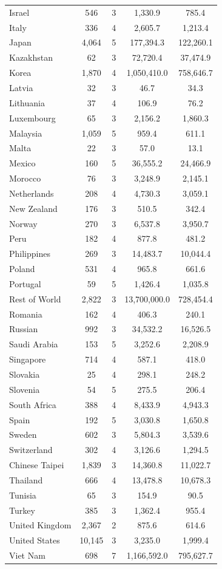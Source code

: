 \begin{center}
{\begin{tabular}{lcccc}
			Israel&546&3&1,330.9&785.4 \\
			Italy&336&4&2,605.7&1,213.4 \\
			Japan&4,064&5&177,394.3&122,260.1 \\
			Kazakhstan&62&3&72,720.4&37,474.9 \\
			Korea&1,870&4&1,050,410.0&758,646.7 \\
			Latvia&32&3&46.7&34.3 \\
			Lithuania&37&4&106.9&76.2 \\
			Luxembourg&65&3&2,156.2&1,860.3 \\
			Malaysia&1,059&5&959.4&611.1 \\
			Malta&22&3&57.0&13.1 \\
			Mexico&160&5&36,555.2&24,466.9 \\
			Morocco&76&3&3,248.9&2,145.1 \\
			Netherlands&208&4&4,730.3&3,059.1 \\
			New Zealand&176&3&510.5&342.4 \\
			Norway&270&3&6,537.8&3,950.7 \\
			Peru&182&4&877.8&481.2 \\
			Philippines&269&3&14,483.7&10,044.4 \\
			Poland&531&4&965.8&661.6 \\
			Portugal&59&5&1,426.4&1,035.8 \\
			Rest of World&2,822&3&13,700,000.0&728,454.4 \\
			Romania&162&4&406.3&240.1 \\
			Russian&992&3&34,532.2&16,526.5 \\
			Saudi Arabia&153&5&3,252.6&2,208.9 \\
			Singapore&714&4&587.1&418.0 \\
			Slovakia&25&4&298.1&248.2 \\
			Slovenia&54&5&275.5&206.4 \\
			South Africa&388&4&8,433.9&4,943.3 \\
			Spain&192&5&3,030.8&1,650.8 \\
			Sweden&602&3&5,804.3&3,539.6 \\
			Switzerland&302&4&3,126.6&1,294.5 \\
			Chinese Taipei &1,839&3&14,360.8&11,022.7 \\
			Thailand&666&4&13,478.8&10,678.3 \\
			Tunisia&65&3&154.9&90.5 \\
			Turkey&385&3&1,362.4&955.4 \\
			United Kingdom&2,367&2&875.6&614.6 \\
			United States&10,145&3&3,235.0&1,999.4 \\
			Viet Nam&698&7&1,166,592.0&795,627.7 \\
			\toprule
	\end{tabular}}
	
\end{center}
